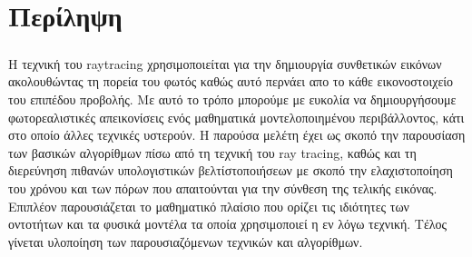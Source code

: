 
\chapter{Περίληψη}       %

\paragraph{}

Η τεχνική του raytracing χρησιμοποιείται για την δημιουργία συνθετικών εικόνων ακολουθώντας
τη πορεία του φωτός καθώς αυτό περνάει απο το κάθε εικονοστοι\-χείο του επιπέδου προβολής.
Με αυτό το τρόπο μπορούμε με ευκολία να δημιουργή\-σουμε φωτορεαλιστικές απεικονίσεις ενός μαθηματικά
μοντελοποιημένου περιβάλ\-λοντος, κάτι στο οποίο άλλες τεχνικές υστερούν. Η παρούσα μελέτη
έχει ως σκοπό την παρουσίαση των βασικών αλγορίθμων πίσω από τη τεχνική του ray tracing, καθώς
και τη διερεύνηση πιθανών υπολογιστικών βελτίστοποιήσεων με σκοπό την ελαχιστοποίηση του 
χρόνου και των πόρων που απαιτούνται για την σύνθεση της τελικής εικόνας. Επιπλέον παρουσιάζεται
το μαθηματικό πλαίσιο που ορίζει τις ιδιότητες των οντοτήτων και τα φυσικά μοντέλα τα οποία 
χρησιμοποιεί η εν λόγω τεχνική. Τέλος γίνεται υλοποίηση των παρουσιαζόμενων τεχνικών και
αλγορίθμων.

